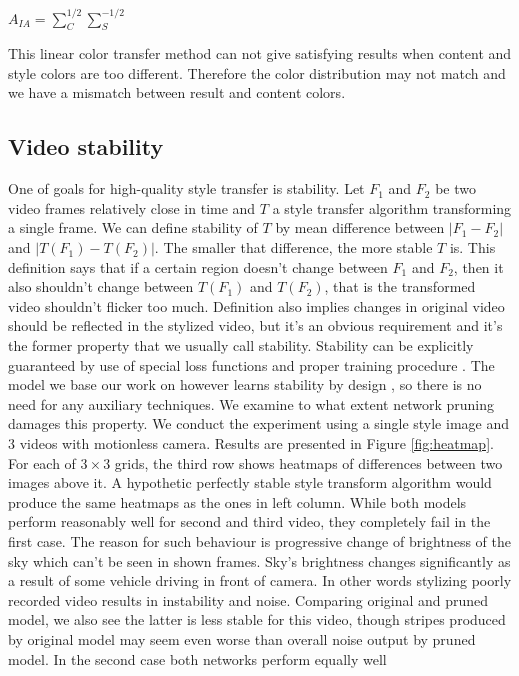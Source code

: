 \documentclass[../Main.tex]{subfiles}
\begin{document}
\begin{center}
$A_{IA}=\sum^{1/2}_C\sum^{-1/2}_S$
\end{center}
This linear color transfer method can not give satisfying results when content and style colors are too different. Therefore the color distribution may not match and we have a mismatch between result and content colors.

\subsection{Video stability}
One of goals for high-quality style transfer is stability. Let $F_1$ and $F_2$ be 
two video frames relatively close in time and $T$ a style transfer algorithm transforming
a single frame. We can define stability of $T$ by mean difference between
$| F_1 - F_2 |$ and $|T(F_1)-T(F_2)|$. The smaller that difference, the more stable $T$ is.
This definition says that if a certain region doesn't change between $F_1$ and $F_2$, then
it also shouldn't change between $T(F_1)$ and $T(F_2)$, that is the transformed video
shouldn't flicker too much. Definition also implies changes in original video
should be reflected in the stylized video, but it's an obvious requirement and it's
the former property that we usually call stability.
Stability can be explicitly guaranteed by use of special loss functions
and proper training procedure \cite{stability1, stability2}. The model we base our work
on however learns stability by design \cite{Li2018}, so there is no need for
any auxiliary techniques. We examine to what extent network pruning damages this 
property. We conduct the experiment using a single style image and 3 videos with motionless
camera. Results are presented in Figure \ref{fig:heatmap}.
For each of $3\times3$ grids, the third row shows heatmaps of differences between 
two images above it. A hypothetic perfectly stable style transform algorithm would
produce the same heatmaps as the ones in left column. While both models perform
reasonably well for second and third video, they completely fail in the first case.
The reason for such behaviour is progressive change of brightness of the sky
which can't be seen in shown frames. Sky's brightness changes significantly 
as a result of some vehicle driving in front of camera. In other words
stylizing poorly recorded video results in instability and noise. Comparing
original and pruned model, we also see the latter is less stable for this video,
though stripes produced by original model may seem even worse than overall
noise output by pruned model. In the second case both networks perform equally well
\end{document}
